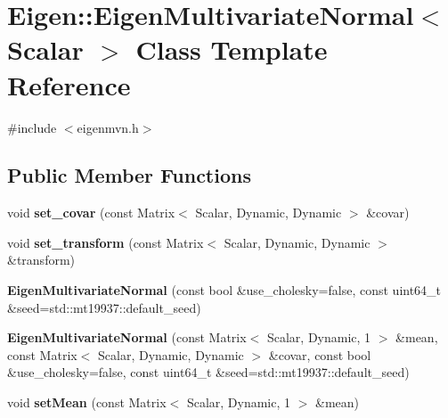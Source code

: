\hypertarget{classEigen_1_1EigenMultivariateNormal}{\section{Eigen\+:\+:Eigen\+Multivariate\+Normal$<$ Scalar $>$ Class Template Reference}
\label{classEigen_1_1EigenMultivariateNormal}
}


{\ttfamily \#include $<$eigenmvn.\+h$>$}

\subsection*{Public Member Functions}
\begin{DoxyCompactItemize}
\item 
\hypertarget{classEigen_1_1EigenMultivariateNormal_a5c226d14c6597ad2314a2730f9b2e402}{void {\bfseries set\+\_\+covar} (const Matrix$<$ Scalar, Dynamic, Dynamic $>$ \&covar)}\label{classEigen_1_1EigenMultivariateNormal_a5c226d14c6597ad2314a2730f9b2e402}

\item 
\hypertarget{classEigen_1_1EigenMultivariateNormal_a05fa9ab49cb21d677c7ed84a276964a7}{void {\bfseries set\+\_\+transform} (const Matrix$<$ Scalar, Dynamic, Dynamic $>$ \&transform)}\label{classEigen_1_1EigenMultivariateNormal_a05fa9ab49cb21d677c7ed84a276964a7}

\item 
\hypertarget{classEigen_1_1EigenMultivariateNormal_ad8dc1c371b98d343741f144a3babef91}{{\bfseries Eigen\+Multivariate\+Normal} (const bool \&use\+\_\+cholesky=false, const uint64\+\_\+t \&seed=std\+::mt19937\+::default\+\_\+seed)}\label{classEigen_1_1EigenMultivariateNormal_ad8dc1c371b98d343741f144a3babef91}

\item 
\hypertarget{classEigen_1_1EigenMultivariateNormal_a427929ac9e14e93d56ec6acdb85a8dbb}{{\bfseries Eigen\+Multivariate\+Normal} (const Matrix$<$ Scalar, Dynamic, 1 $>$ \&mean, const Matrix$<$ Scalar, Dynamic, Dynamic $>$ \&covar, const bool \&use\+\_\+cholesky=false, const uint64\+\_\+t \&seed=std\+::mt19937\+::default\+\_\+seed)}\label{classEigen_1_1EigenMultivariateNormal_a427929ac9e14e93d56ec6acdb85a8dbb}

\item 
\hypertarget{classEigen_1_1EigenMultivariateNormal_aa9b735112cea507cd0a5f0eeffafe3c2}{void {\bfseries set\+Mean} (const Matrix$<$ Scalar, Dynamic, 1 $>$ \&mean)}\label{classEigen_1_1EigenMultivariateNormal_aa9b735112cea507cd0a5f0eeffafe3c2}


\end{DoxyCompactItemize}
